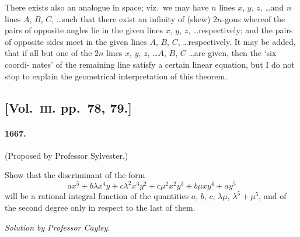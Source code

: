 \documentclass[11pt,a4paper]{article}
\begin{document}
There exists also an analogue in space; viz.\ we may have $n$ lines $x$, $y$, $z$, \ldots and
$n$ lines $A$, $B$, $C$, \ldots such that there exist an infinity of (skew) $2n$-gons whereof the
pairs of opposite angles lie in the given lines $x$, $y$, $z$, \ldots respectively; and the pairs
of opposite sides meet in the given lines $A$, $B$, $C$, \ldots respectively. It may be added, that
if all but one of the $2n$ lines $x$, $y$, $z$, \ldots $A$, $B$, $C$ \ldots are given, then the `six coordi-
\noindent nates' of the remaining line satisfy a certain linear equation, but I do not stop to
explain the geometrical interpretation of this theorem.

\subsection*{[Vol.~\textsc{iii}. pp.\ 78, 79.]}

\paragraph*{1667.} (Proposed by Professor Sylvester.)

Show that the discriminant of the form
\[
ax^5 + b\lambda x^4y + c\lambda^2x^3y^2 + c\mu^2x^2y^3 + b\mu xy^4 + ay^5
\]
will be a rational integral function of the quantities $a$, $b$, $c$, $\lambda\mu$, $\lambda^5+\mu^5$, and of the
second degree only in respect to the last of them.

\begin{center}
\textit{Solution by Professor Cayley.}
\end{center}
\end{document}
